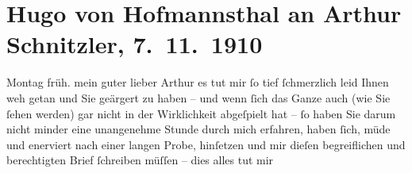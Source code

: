 

         
         \renewcommand{\erwaehntePersonen}{Personen: Sigmund Freud, Gertrude von Hofmannsthal}
         \renewcommand{\erwaehnteOrte}{Orte: Graz, Wien}
         \renewcommand{\erwaehnteWerke}{Werke: Der Weg ins Freie. Roman, Der junge Medardus. Dramatische Historie in einem Vorspiel und fünf Aufzügen, Zur Psychopathologie des Alltagslebens}
               \section[Hugo von Hofmannsthal an Arthur Schnitzler, 7. 11. 1910]{ Hugo von Hofmannsthal an Arthur Schnitzler, 7. 11. 1910}\nopagebreak{}\rehead{ }\begin{ledgroupsized}[t]{13cm}\normalsize\beginnumbering \toendnotes[C]{\smallbreak\pagebreak[2]} 
\toendnotes[C]{\smallbreak}\pstart
           \raggedleft{}{\pb}Montag{ }früh.\pend
           \pstart{}mein guter lieber Arthur \pend\pstart
           es tut mir ſo tief ſchmerzlich leid Ihnen weh getan und Sie geärgert zu haben – und
               wenn ſich das Ganze auch (wie Sie ſehen werden) gar nicht in der Wirklichkeit
               abgeſpielt hat – ſo haben Sie darum nicht minder eine unangenehme Stunde durch mich
               erfahren, haben ſich, {\pb}müde und
               enerviert nach einer langen Probe, hinſetzen und
               mir dieſen begreiflichen und berechtigten Brief ſchreiben müſſen – dies alles tut mir

\end{ledgroupsized}
